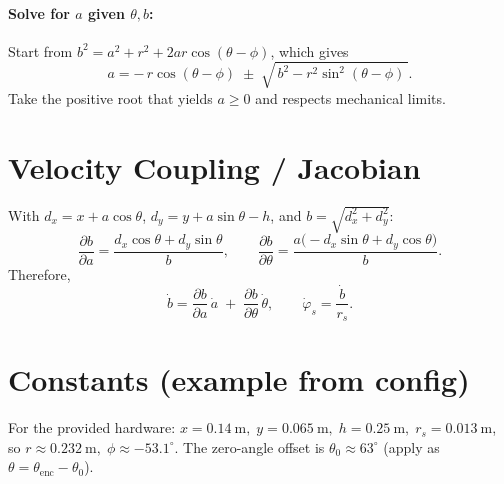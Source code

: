 \documentclass[11pt]{article}
\begin{document}
\paragraph{Solve for \(a\) given \(\theta, b\):}
Start from \(b^2 = a^2 + r^2 + 2ar\cos(\theta-\phi)\), which gives
\[
a = -\,r\cos(\theta-\phi) \;\pm\; \sqrt{\,b^2 - r^2 \sin^2(\theta-\phi)\,}.
\]
Take the positive root that yields \(a \ge 0\) and respects mechanical limits.

\section*{Velocity Coupling / Jacobian}
With \(d_x = x + a\cos\theta\), \(d_y = y + a\sin\theta - h\), and \(b = \sqrt{d_x^2 + d_y^2}\):
\[
\frac{\partial b}{\partial a} = \frac{d_x \cos\theta + d_y \sin\theta}{b}, \qquad
\frac{\partial b}{\partial \theta} = \frac{a\bigl(-d_x \sin\theta + d_y \cos\theta\bigr)}{b}.
\]
Therefore,
\[
\dot b = \frac{\partial b}{\partial a}\,\dot a \;+\; \frac{\partial b}{\partial \theta}\,\dot \theta,
\qquad
\dot \varphi_s = \frac{\dot b}{r_s}.
\]

\section*{Constants (example from config)}
For the provided hardware: \(x = 0.14\ \text{m},\; y = 0.065\ \text{m},\; h = 0.25\ \text{m},\; r_s = 0.013\ \text{m}\), so \(r \approx 0.232\ \text{m},\; \phi \approx -53.1^\circ\). The zero-angle offset is \(\theta_0 \approx 63^\circ\) (apply as \(\theta = \theta_{\text{enc}} - \theta_0\)).
\end{document}
